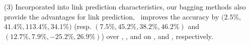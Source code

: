 \sstab (3) Incorporated into link prediction characteristics, our
bagging methods also provide the  advantages for link prediction,
\eg~\Biased improves the accuracy by $(2.5\%$, $41.4\%, 113.4\%, 34.1\%)$ (resp. $(7.5\%, 45.2\%, 38.2\%, 46.2\%)$ and $(12.7\%, 7.9\%, -25.2\%, 26.9\%)$)
over \NMF, \Aa, \RA and \BIGCLAM on \Digg, \YouTube and \Wikipedia, respectively.













%
%
%
%
%
%


